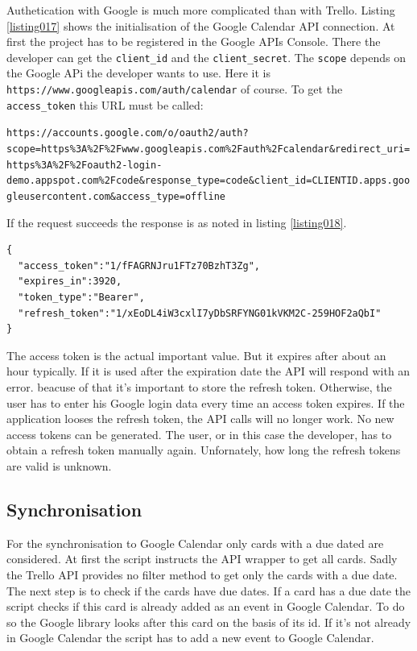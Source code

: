 Authetication with Google is much more complicated than with Trello. Listing \ref{listing017} shows the initialisation of the Google Calendar API connection. At first the project has to be registered in the Google APIs Console. \cite{google:apisconsole} There the developer can get the \lstinline{client_id} and the \lstinline{client_secret}. The \lstinline{scope} depends on the Google APi the developer wants to use. Here it is \texttt{https://www.googleapis.com/auth/calendar} of course. \cite{google:apiscope} To get the \lstinline{access_token} this URL must be called: 
\begin{center}
\lstinline{https://accounts.google.com/o/oauth2/auth?scope=https%3A%2F%2Fwww.googleapis.com%2Fauth%2Fcalendar&redirect_uri=https%3A%2F%2Foauth2-login-demo.appspot.com%2Fcode&response_type=code&client_id=CLIENTID.apps.googleusercontent.com&access_type=offline}
\end{center}

If the request succeeds the response is as noted in listing \ref{listing018}.

\begin{lstlisting}[aboveskip=1\baselineskip, caption=Response of the token request., label=listing018]
{
  "access_token":"1/fFAGRNJru1FTz70BzhT3Zg",
  "expires_in":3920,
  "token_type":"Bearer",
  "refresh_token":"1/xEoDL4iW3cxlI7yDbSRFYNG01kVKM2C-259HOF2aQbI"
}
\end{lstlisting}

The access token is the actual important value. But it expires after about an hour typically. If it is used after the expiration date the API will respond with an error. beacuse of that it's important to store the refresh token. Otherwise, the user has to enter his Google login data every time an access token expires. If the application looses the refresh token, the API calls will no longer work. No new access tokens can be generated. The user, or in this case the developer, has to obtain a refresh token manually again. \cite{google:calapi} Unfornately, how long the refresh tokens are valid is unknown.

\subsection{Synchronisation}
For the synchronisation to Google Calendar only cards with a due dated are considered. At first the script instructs the API wrapper to get all cards. Sadly the Trello API provides no filter method to get only the cards with a due date. The next step is to check if the cards have due dates. If a card has a due date the script checks if this card is already added as an event in Google Calendar. To do so the Google library looks after this card on the basis of its id. If it's not already in Google Calendar the script has to add a new event to Google Calendar.

